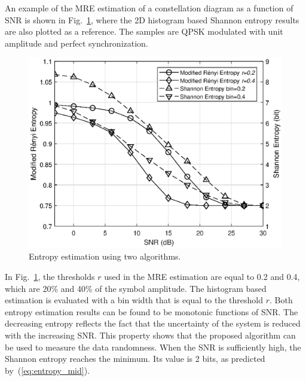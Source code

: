 \documentclass[12pt, draftclsnofoot, onecolumn]{IEEEtran}
\begin{document}

An example of the MRE estimation of a constellation diagram as a function of SNR is shown in Fig.~\ref{fig:MRE}, where the 2D histogram based Shannon entropy results are also plotted as a reference.
The samples are QPSK modulated with unit amplitude and perfect synchronization.

\begin{figure}[ht]
\centering
\includegraphics[width=3.1 in]{pic/MRE-k.eps}
\caption{Entropy estimation using two algorithms.}
\label{fig:MRE} 
\end{figure}

In Fig.~\ref{fig:MRE}, the thresholds \(r\) used in the MRE estimation are equal to 0.2 and 0.4, which are 20\% and 40\% of the symbol amplitude. 
The histogram based estimation is evaluated with a bin width that is equal to the threshold \(r\).
Both entropy estimation results can be found to be monotonic functions of SNR.
The decreasing entropy reflects the fact that the uncertainty of the system is reduced with the increasing SNR.
This property shows that the proposed algorithm can be used to measure the data randomness.
When the SNR is sufficiently high, the Shannon entropy reaches the minimum. 
Its value is 2 bits, as predicted by~(\ref{eq:entropy_mid}).
\end{document}
